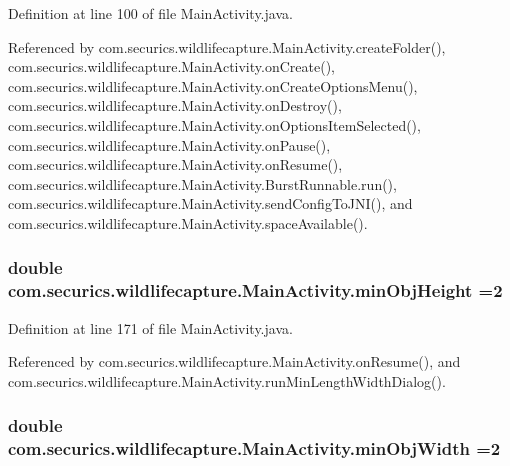 Definition at line 100 of file Main\+Activity.\+java.



Referenced by com.\+securics.\+wildlifecapture.\+Main\+Activity.\+create\+Folder(), com.\+securics.\+wildlifecapture.\+Main\+Activity.\+on\+Create(), com.\+securics.\+wildlifecapture.\+Main\+Activity.\+on\+Create\+Options\+Menu(), com.\+securics.\+wildlifecapture.\+Main\+Activity.\+on\+Destroy(), com.\+securics.\+wildlifecapture.\+Main\+Activity.\+on\+Options\+Item\+Selected(), com.\+securics.\+wildlifecapture.\+Main\+Activity.\+on\+Pause(), com.\+securics.\+wildlifecapture.\+Main\+Activity.\+on\+Resume(), com.\+securics.\+wildlifecapture.\+Main\+Activity.\+Burst\+Runnable.\+run(), com.\+securics.\+wildlifecapture.\+Main\+Activity.\+send\+Config\+To\+J\+N\+I(), and com.\+securics.\+wildlifecapture.\+Main\+Activity.\+space\+Available().

\subsubsection[{min\+Obj\+Height}]{\setlength{\rightskip}{0pt plus 5cm}double com.\+securics.\+wildlifecapture.\+Main\+Activity.\+min\+Obj\+Height =2\hspace{0.3cm}{\ttfamily [static]}}\label{classcom_1_1securics_1_1wildlifecapture_1_1_main_activity_a2bc09e24cfc9caf85eb5af413eb5e33c}


Definition at line 171 of file Main\+Activity.\+java.



Referenced by com.\+securics.\+wildlifecapture.\+Main\+Activity.\+on\+Resume(), and com.\+securics.\+wildlifecapture.\+Main\+Activity.\+run\+Min\+Length\+Width\+Dialog().

\subsubsection[{min\+Obj\+Width}]{\setlength{\rightskip}{0pt plus 5cm}double com.\+securics.\+wildlifecapture.\+Main\+Activity.\+min\+Obj\+Width =2\hspace{0.3cm}{\ttfamily [static]}}\label{classcom_1_1securics_1_1wildlifecapture_1_1_main_activity_a79862d70fd84dc5dbde834a40007e23f}


